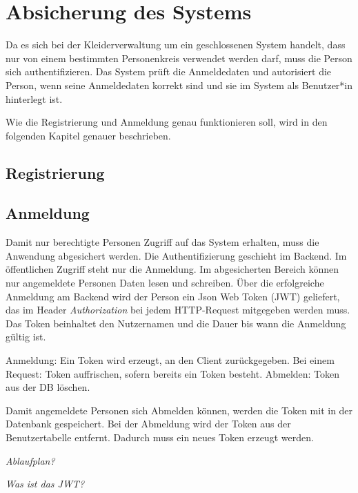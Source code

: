 \section{Absicherung des Systems}\label{sec:Security}

Da es sich bei der Kleiderverwaltung um ein geschlossenen System handelt, dass nur von einem bestimmten Personenkreis verwendet werden darf, muss die Person sich authentifizieren. Das System prüft die Anmeldedaten und autorisiert die Person, wenn seine Anmeldedaten korrekt sind und sie im System als Benutzer*in hinterlegt ist.

Wie die Registrierung und Anmeldung genau funktionieren soll, wird in den folgenden Kapitel genauer beschrieben.

\subsection{Registrierung}



\subsection{Anmeldung}

Damit nur berechtigte Personen Zugriff auf das System erhalten, muss die Anwendung abgesichert werden. Die Authentifizierung geschieht im Backend. Im öffentlichen Zugriff steht nur die Anmeldung. Im abgesicherten Bereich können nur angemeldete Personen Daten lesen und schreiben. Über die erfolgreiche Anmeldung am Backend wird der Person ein Json Web Token (JWT) geliefert, das im Header \textit{Authorization} bei jedem HTTP-Request mitgegeben werden muss. Das Token beinhaltet den Nutzernamen und die Dauer bis wann die Anmeldung gültig ist. 

Anmeldung: Ein Token wird erzeugt, an den Client zurückgegeben.
Bei einem Request: Token auffrischen, sofern bereits ein Token besteht.
Abmelden: Token aus der DB löschen.

Damit angemeldete Personen sich Abmelden können, werden die Token mit in der Datenbank gespeichert. Bei der Abmeldung wird der Token aus der Benutzertabelle entfernt. Dadurch muss ein neues Token erzeugt werden.

\textit{Ablaufplan?}

\textit{Was ist das JWT?}

